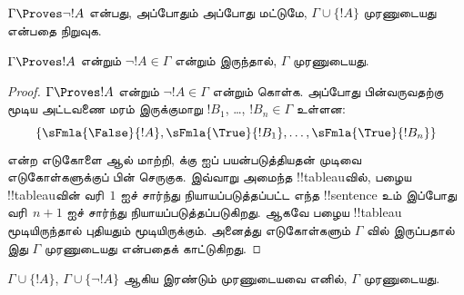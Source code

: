 \documentclass[../../../include/open-logic-section]{subfiles}
\begin{document}
\begin{prob}
$\Gamma \Proves \lnot !A$ என்பது, அப்போதும் அப்போது மட்டுமே, $\Gamma
\cup \{!A\}$ முரணுடையது என்பதை நிறுவுக.
\end{prob}

\begin{prop}
  $\Gamma \Proves !A$ என்றும் $\lnot !A \in \Gamma$ என்றும் இருந்தால்,
  $\Gamma$ முரணுடையது.
\end{prop}

\begin{proof}
  $\Gamma \Proves !A$ என்றும் $\lnot !A \in \Gamma$ என்றும் கொள்க. அப்போது
  பின்வருவதற்கு மூடிய அட்டவணை மரம் இருக்குமாறு $!B_1$, \dots,
  $!B_n \in \Gamma$ உள்ளன:
  \[
  \{\sFmla{\False}{!A}, \sFmla{\True}{!B_1}, \dots, \sFmla{\True}{!B_n}\}
  \]
   என்ற எடுகோளை  ஆல்
  மாற்றி,  க்கு \TRule{\True}{\lnot} ஐப்
  பயன்படுத்தியதன் முடிவை எடுகோள்களுக்குப் பின் செருகுக. இவ்வாறு அமைந்த
  !!{tableau}வில், பழைய !!{tableau}வின் வரி~$1$ ஐச் சார்ந்து
  நியாயப்படுத்தப்பட்ட எந்த !!{sentence} உம்
  இப்போது வரி~$n+1$ ஐச் சார்ந்து நியாயப்படுத்தப்படுகிறது. ஆகவே பழைய
  !!{tableau} மூடியிருந்தால் புதியதும் மூடியிருக்கும். அனைத்து எடுகோள்களும்
  $\Gamma$ வில் இருப்பதால் இது $\Gamma$ முரணுடையது என்பதைக் காட்டுகிறது.
\end{proof}

\begin{prop}
  $\Gamma \cup \{!A\}$, $\Gamma \cup \{\lnot !A\}$ ஆகிய இரண்டும்
  முரணுடையவை எனில், $\Gamma$ முரணுடையது.
\end{prop}
\end{document}
